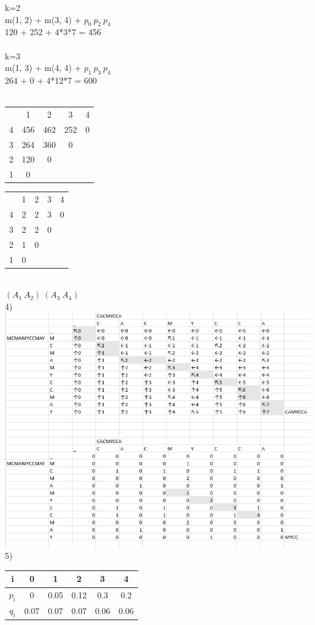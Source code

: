 \documentclass{article}
\begin{document}
    k=2 \\
    m(1, 2) + m(3, 4) + $ p_{0}\ p_{2}\  p_{4}$\\
    120 + 252 + 4*3*7 = 456\\\\

    k=3 \\
    m(1, 3) + m(4, 4) + $ p_{1}\ p_{3}\  p_{4}$\\
    264 + 0 + 4*12*7 = 600\\\\

    \begin{tabular}{ c | c | c | c | c }
            
        & 1 & 2 & 3 & 4 \\ 
    4 & 456 & 462 & 252 & 0 \\  
    3 & 264 & 360 & 0 \\
    2 & 120 & 0 \\
    1 & 0     
    \end{tabular}
    \begin{tabular}{ c | c | c | c | c }
            
        & 1 & 2 & 3 & 4 \\ 
      4 & 2 & 2 & 3 & 0 \\  
      3 & 2 & 2 & 0 \\
      2 & 1 & 0 \\
      1 & 0     
    \end{tabular}\\
 $ (A_{1} \  A_{2}) \  (A_{3} \ A_{4}) $\\
 4)   \\
    \includegraphics[scale=0.5]{subsequence.png}
5)\\
\begin{tabular}{ c | c | c | c | c | c}         
          i & 0 & 1 & 2 & 3 & 4 \\ 
\hline    $p_{i}$ & 0 & 0.05 & 0.12 & 0.3 & 0.2 \\  
\hline    $q_{i}$ & 0.07 & 0.07 & 0.07 & 0.06 & 0.06 \\
\end{tabular}
\\\\
\end{document}
